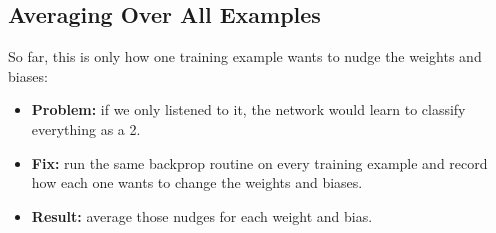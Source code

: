 \subsection*{Averaging Over All Examples}
\begin{keeptogether}
So far, this is only how one training example wants to nudge the weights and biases:
\begin{itemize}
  \item \textbf{Problem:} if we only listened to it, the network would learn to classify everything as a 2.
  \item \textbf{Fix:} run the same backprop routine on every training example and record how each one wants to change the weights and biases.
  \item \textbf{Result:} average those nudges for each weight and bias.
\end{itemize}


\end{keeptogether}
